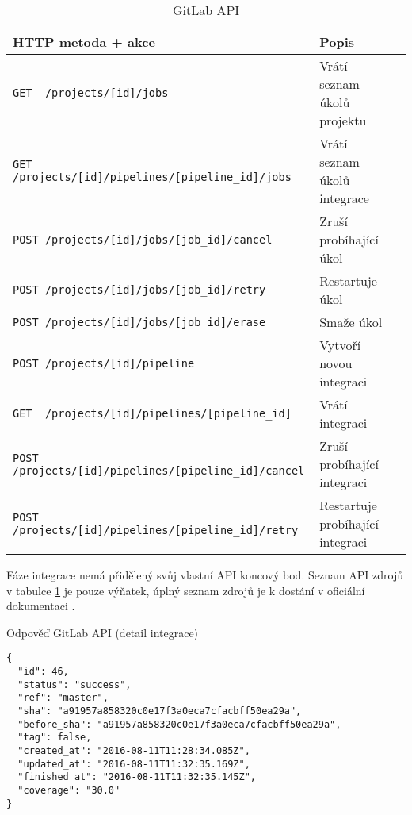 \begin{table}[htbp]
\centering
\fontsize{9.5}{11.5}\selectfont
\caption{GitLab API}
\label{table:gitlab-api-spec}
\begin{tabular}{|l|l|l|}
\hline
HTTP metoda + akce                                          & Popis \\ \hline
\verb|GET  /projects/[id]/jobs|                             & Vrátí seznam úkolů projektu      \\ \hline
\verb|GET  /projects/[id]/pipelines/[pipeline_id]/jobs|     & Vrátí seznam úkolů integrace      \\ \hline
\verb|POST /projects/[id]/jobs/[job_id]/cancel|             & Zruší probíhající úkol      \\ \hline
\verb|POST /projects/[id]/jobs/[job_id]/retry|              & Restartuje úkol      \\ \hline
\verb|POST /projects/[id]/jobs/[job_id]/erase|              & Smaže úkol      \\ \hline
\verb|POST /projects/[id]/pipeline|                         & Vytvoří novou integraci      \\ \hline
\verb|GET  /projects/[id]/pipelines/[pipeline_id]|          & Vrátí integraci      \\ \hline
\verb|POST /projects/[id]/pipelines/[pipeline_id]/cancel|   & Zruší probíhající integraci      \\ \hline
\verb|POST /projects/[id]/pipelines/[pipeline_id]/retry|    & Restartuje probíhající integraci      \\ \hline
\end{tabular}
\end{table}

Fáze integrace nemá přidělený svůj vlastní API koncový bod.
Seznam API zdrojů v tabulce \ref{table:gitlab-api-spec} je pouze výňatek, úplný seznam zdrojů je k dostání v oficiální dokumentaci \cite{gitlab_api}. 

\begin{listing}[ht]
\caption{\label{code:gitlab-api-json-response}Odpověď GitLab API (detail integrace)}
\begin{verbatim}
{
  "id": 46,
  "status": "success",
  "ref": "master",
  "sha": "a91957a858320c0e17f3a0eca7cfacbff50ea29a",
  "before_sha": "a91957a858320c0e17f3a0eca7cfacbff50ea29a",
  "tag": false,
  "created_at": "2016-08-11T11:28:34.085Z",
  "updated_at": "2016-08-11T11:32:35.169Z",
  "finished_at": "2016-08-11T11:32:35.145Z",
  "coverage": "30.0"
}
\end{verbatim}
\end{listing}

